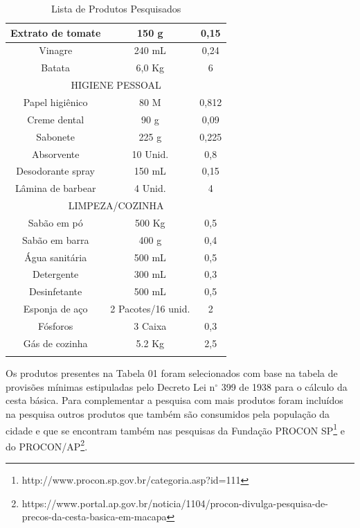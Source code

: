 \documentclass{ifto-tex}
\begin{document}
\begin{longtable}{|c|c|c|}
			\hline
			Extrato de tomate & 150 g              & 0,15            \\
			\hline
			Vinagre           & 240 mL             & 0,24            \\
			\hline
			Batata            & 6,0 Kg             & 6               \\
			\hline
			\multicolumn{3}{|c|}{HIGIENE PESSOAL}                      \\
			\hline
			Papel higiênico   & 80 M               & 0,812           \\
			\hline
			Creme dental      & 90 g               & 0,09            \\
			\hline
			Sabonete          & 225 g              & 0,225           \\
			\hline
			Absorvente        & 10 Unid.           & 0,8             \\
			\hline
			Desodorante spray & 150 mL             & 0,15            \\
			\hline
			Lâmina de barbear & 4 Unid.            & 4               \\
			\hline
			\multicolumn{3}{|c|}{LIMPEZA/COZINHA}                      \\
			\hline
			Sabão em pó       & 500 Kg             & 0,5             \\
			\hline
			Sabão em barra    & 400 g              & 0,4             \\
			\hline
			Água sanitária    & 500 mL             & 0,5             \\
			\hline
			Detergente        & 300 mL             & 0,3             \\
			\hline
			Desinfetante      & 500 mL             & 0,5             \\
			\hline
			Esponja de aço    & 2 Pacotes/16 unid. & 2               \\
			\hline
			Fósforos          & 3 Caixa            & 0,3             \\
			\hline
			Gás de cozinha    & 5.2 Kg             & 2,5       \\
			\hline     
	\caption{Lista de Produtos Pesquisados}
	\end{longtable}
	
Os produtos presentes na Tabela 01 foram selecionados com base na tabela de provisões mínimas estipuladas pelo Decreto Lei n$^{\circ}$ 399 de 1938 para o cálculo da cesta básica. Para complementar a pesquisa com mais produtos foram incluídos na pesquisa outros produtos que também são consumidos pela população da cidade e que se encontram também nas pesquisas da Fundação PROCON SP\footnote{http://www.procon.sp.gov.br/categoria.asp?id=111} e do PROCON/AP\footnote{https://www.portal.ap.gov.br/noticia/1104/procon-divulga-pesquisa-de-precos-da-cesta-basica-em-macapa}.
\end{document}
